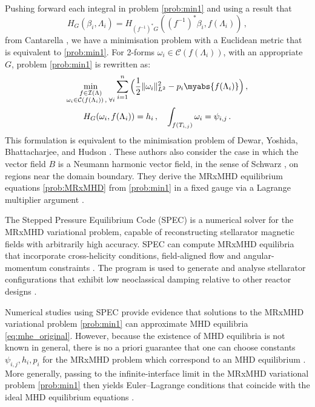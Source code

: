 \documentclass[11pt]{article}
\theoremstyle{plain}
\theoremstyle{definition}
\theoremstyle{remark}
\newcommand{\ST}{\Lambda}
\newcommand{\I}{\mathcal{I}(\ST)}
\begin{document}
Pushing forward each integral in problem \eqref{prob:min1} and using a result that 
\[
H_G ( \beta_i , \ST_i ) = H_{(f^{-1})^* G} (  (f^{-1})^*  \beta_i , f(\ST_i) ) \, ,
\]
from Cantarella \cite{CANTARELLA20101127}, we have a minimisation problem with a Euclidean metric that is equivalent to \eqref{prob:min1}. For 2-forms \(\omega_i \in \mathcal{C} ( f(\ST_i) )\), with an appropriate \(G\), problem \eqref{prob:min1} is rewritten as:
\begin{align*} 
\begin{gathered}
\min_{\substack{f \in \I \\  \omega_i \in \mathcal{C} ( f(\ST_i) ) \, , \; \forall i }} \sum_{i=1}^n \Big( \frac{1}{2} \|  \omega_i\|_{L^2}^2 - p_i \myabs{f(\ST_i)} \Big) \, , \\ H_{G} ( \omega_i , f(\ST_i) ) = h_i \, , 
  \quad \int_{f(T_{i,j})}  \omega_i = \psi_{i,j} \, .
\end{gathered}
\end{align*}
This formulation is equivalent to the minimisation problem of Dewar, Yoshida, Bhattacharjee, and Hudson \cite{Dewar_Yoshida_Bhattacharjee_Hudson_2015}. These authors also consider the case in which the vector field \(B\) is a Neumann harmonic vector field, in the sense of Schwarz \cite{schwarz-1995}, on regions near the domain boundary. They derive the MRxMHD equilibrium equations \eqref{prob:MRxMHD} from \eqref{prob:min1} in a fixed gauge via a Lagrange multiplier argument \cite{Dewar_Yoshida_Bhattacharjee_Hudson_2015}.





The Stepped Pressure Equilibrium Code (SPEC) is a numerical solver for the MRxMHD variational problem, capable of reconstructing stellarator magnetic fields with arbitrarily high accuracy. SPEC can compute MRxMHD equilibria that incorporate cross-helicity conditions, field-aligned flow and angular-momentum constraints \cite{hudson2020free, qu2020stepped}. The program is used to generate and analyse stellarator configurations that exhibit low neoclassical damping relative to other reactor designs \cite{loizu2016verification, helander2008intrinsic}.



Numerical studies using SPEC provide evidence that solutions to the MRxMHD variational problem \eqref{prob:min1} can approximate MHD equilibria \eqref{eq:mhe_original}. However, because the existence of MHD equilibria is not known in general, there is no a priori guarantee that one can choose constants \(\psi_{i,j}, h_i, p_i\) for the MRxMHD problem which correspond to an MHD equilibrium \cite{10.1063/1.4795739}. More generally, passing to the infinite-interface limit in the MRxMHD variational problem \ref{prob:min1} then yields Euler–Lagrange conditions that coincide with the ideal MHD equilibrium equations \cite{10.1063/1.4795739}. 
\end{document}
